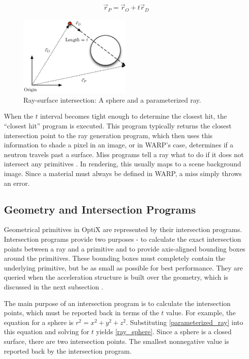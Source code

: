 \begin{equation}
\label{parameterized_ray}
\begin{split}
\vec{r}_P = \vec{r}_O + t \vec{r}_D 
\end{split}
\end{equation}

\begin{figure}[h!] 
  \centering
    \includegraphics[width=0.5\textwidth]{graphics/ray_surface.eps}
     \caption{Ray-surface intersection:  A sphere and a parameterized ray. \label{ray_surface}}
\end{figure}

When the $t$ interval becomes tight enough to determine the closest hit, the ``closest hit'' program is executed.  This program typically returns the closest intersection point to the ray generation program, which then uses this information to shade a pixel in an image, or in WARP's case, determines if a neutron travels past a surface.  Miss programs tell a ray what to do if it does not intersect any primitives \cite{optix}.  In rendering, this usually maps to a scene background image.  Since a material must always be defined in WARP, a miss simply throws an error.

\subsection{Geometry and Intersection Programs}

Geometrical primitives in OptiX are represented by their intersection programs.  Intersection programs provide two purposes - to calculate the exact intersection points between a ray and a primitive and to provide axis-aligned bounding boxes around the primitives.  These bounding boxes must completely contain the underlying primitive, but be as small as possible for best performance.  They are queried when the acceleration structure is built over the geometry, which is discussed in the next subsection \cite{optix}.  

The main purpose of an intersection program is to calculate the intersection points, which must be reported back in terms of the $t$ value.  For example, the equation for a sphere is $r^2=x^2+y^2+z^2$.  Substituting \eqref{parameterized_ray} into this equation and solving for $t$ yields \eqref{ray_sphere}.  Since a sphere is a closed surface, there are two intersection points.  The smallest nonnegative value is reported back by the intersection program.

